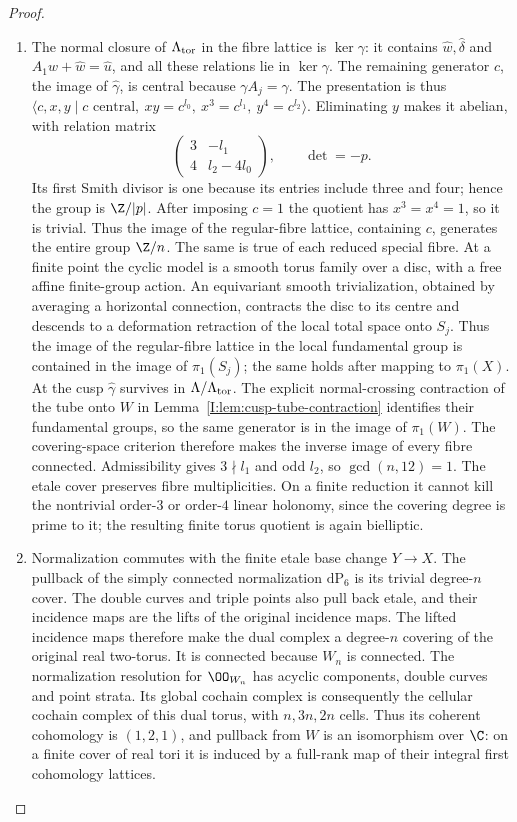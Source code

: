 \begin{proof}
\begin{enumerate}[label=\arabic*.,leftmargin=*]
\item The normal closure of $\Lambda_{\rm tor}$ in the fibre lattice is
$\ker\gamma$: it contains $\hat w,\hat\delta$ and
$A_1\hat w+\hat w=\hat u$, and all these relations lie in
$\ker\gamma$. The remaining generator $c$, the image of
$\hat\gamma$, is central because $\gamma A_j=\gamma$.
The presentation is thus
$\langle c,x,y\mid c\text{ central},\ xy=c^{l_0},\
x^3=c^{l_1},\ y^4=c^{l_2}\rangle$.
Eliminating $y$ makes it abelian, with relation matrix
\[
 \begin{pmatrix}3&-l_1\\4&l_2-4l_0\end{pmatrix},
 \qquad\det=-p.
\]
Its first Smith divisor is one because its entries include three
and four; hence the group is $\Z/|p|$.
After imposing $c=1$ the quotient has $x^3=x^4=1$, so it is trivial.
Thus the image of the regular-fibre lattice, containing $c$, generates
the entire group $\Z/n$. The same is true of each reduced special
fibre. At a finite point the cyclic model is a smooth torus family
over a disc, with a free affine finite-group action. An equivariant
smooth trivialization, obtained by averaging a horizontal connection,
contracts the disc to its centre and descends to a deformation
retraction of the local total space onto $S_j$. Thus the image of
the regular-fibre lattice in the local fundamental group is contained
in the image of $\pi_1(S_j)$; the same holds after mapping to
$\pi_1(X)$. At the cusp $\hat\gamma$ survives in
$\Lambda/\Lambda_{\rm tor}$. The explicit normal-crossing contraction
of the tube onto $W$ in Lemma~\ref{I:lem:cusp-tube-contraction} identifies their fundamental groups,
so the same generator is in the image of $\pi_1(W)$.
The covering-space criterion therefore makes the inverse image of
every fibre connected. Admissibility gives $3\nmid l_1$ and odd $l_2$,
so $\gcd(n,12)=1$. The etale cover preserves fibre multiplicities.
On a finite reduction it cannot kill the nontrivial order-$3$ or
order-$4$ linear holonomy, since the covering degree is prime to it;
the resulting finite torus quotient is again bielliptic.

\item Normalization commutes with the finite etale base change $Y\to X$.
The pullback of the simply connected normalization $\mathrm{dP}_6$
is its trivial degree-$n$ cover. The double curves and triple points
also pull back etale, and their incidence maps are the lifts of the
original incidence maps. The lifted incidence maps therefore make the dual complex a
degree-$n$ covering of the original real two-torus. It is connected because
$W_n$ is connected. The normalization resolution for $\OO_{W_n}$
has acyclic components, double curves and point strata. Its global
cochain complex is consequently the cellular cochain complex of this
dual torus, with $n,3n,2n$ cells. Thus its coherent cohomology is
$(1,2,1)$, and pullback from $W$ is an isomorphism over $\C$:
on a finite cover of real tori it is induced by a full-rank map of
their integral first cohomology lattices.


\end{enumerate}
\end{proof}
